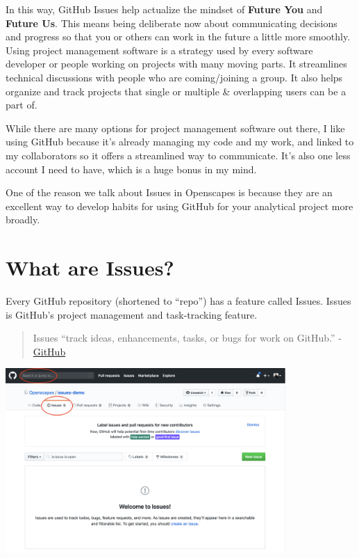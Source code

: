 \documentclass[
  letterpaper,
  DIV=11,
  numbers=noendperiod]{scrreprt}
\begin{document}
In this way, GitHub Issues help actualize the mindset of \textbf{Future
You} and \textbf{Future Us}. This means being deliberate now about
communicating decisions and progress so that you or others can work in
the future a little more smoothly. Using project management software is
a strategy used by every software developer or people working on
projects with many moving parts. It streamlines technical discussions
with people who are coming/joining a group. It also helps organize and
track projects that single or multiple \& overlapping users can be a
part of.

While there are many options for project management software out there,
I like using GitHub because it's already managing my code and my work,
and linked to my collaborators so it offers a streamlined way to
communicate. It's also one less account I need to have, which is a huge
bonus in my mind.

One of the reason we talk about Issues in Openscapes is because they are
an excellent way to develop habits for using GitHub for your analytical
project more broadly.

\hypertarget{what-are-issues}{%
\section{What are Issues?}\label{what-are-issues}}

Every GitHub repository (shortened to ``repo'') has a feature called
Issues. Issues is GitHub's project management and task-tracking feature.

\begin{quote}
Issues ``track ideas, enhancements, tasks, or bugs for work on GitHub.''
- \href{https://help.github.com/en/articles/about-issues}{GitHub}
\end{quote}

\includegraphics[width=0.8\textwidth,height=\textheight]{./img/issues-intro.png}
\end{document}
